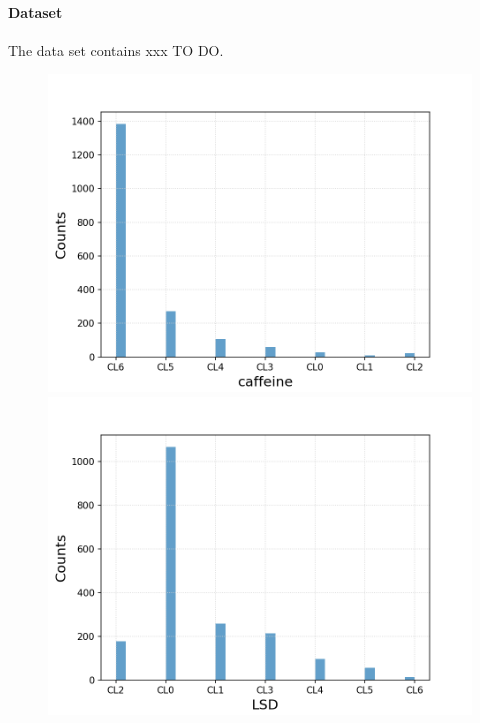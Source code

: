 \documentclass{article}
\begin{document}
\clearpage
\paragraph{Dataset}

\noindent The data set contains xxx TO DO.

\begin{figure}[h!]
	\centering
	\begin{minipage}[b]{0.32\textwidth}
		\includegraphics[width=\textwidth]{plots/drugsPlots/caffeine.png}

	\end{minipage}
	\begin{minipage}[b]{0.32\textwidth}
		\includegraphics[width=\textwidth]{plots/drugsPlots/LSD.png}


\end{minipage}
\end{figure}
\end{document}
